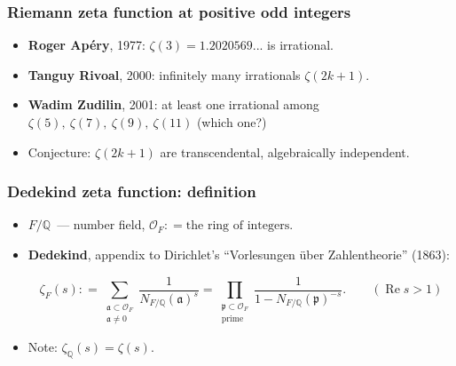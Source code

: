 \documentclass[handout]{beamer}
\newcommand{\personality}[1]{{\bf #1}}
\newcommand{\QQ}{\mathbb{Q}}
\renewcommand{\O}{\mathcal{O}}
\newcommand{\dfn}{\mathrel{\mathop:}=}
\begin{document}

\begin{frame}
  \frametitle{Riemann zeta function at positive odd integers}

  \begin{itemize}
  \item<2-> \personality{Roger Ap\'ery}, 1977: $\zeta (3) = 1.2020569...$ is
    irrational.

  \item<3-> \personality{Tanguy Rivoal}, 2000: infinitely many irrationals
    $\zeta (2k+1)$.

  \item<4-> \personality{Wadim Zudilin}, 2001: at least one irrational among\\
    $\zeta(5), ~ \zeta(7), ~ \zeta(9), ~ \zeta(11)$ (which one?)

  \item<5-> Conjecture: $\zeta (2k+1)$ are transcendental, algebraically
    independent.
  \end{itemize}
\end{frame}


\begin{frame}
  \frametitle{Dedekind zeta function: definition}

  \begin{itemize}
  \item<2-> $F/\QQ$~--- number field, $\O_F \dfn \text{the ring of integers}$.

  \item<3-> \personality{Dedekind}, appendix to Dirichlet's ``Vorlesungen \"uber
    Zahlentheorie'' (1863):

    \[ \zeta_F (s) \dfn \sum_{\substack{\mathfrak{a} \subset \O_F \\ \mathfrak{a} \ne 0}} \frac{1}{N_{F/\QQ} (\mathfrak{a})^s} =
      \prod_{\substack{\mathfrak{p} \subset \O_F \\ \text{prime}}} \frac{1}{1 - N_{F/\QQ} (\mathfrak{p})^{-s}}.
      \quad\quad (\operatorname{Re} s > 1) \]

  \item<4-> Note: $\zeta_\QQ (s) = \zeta (s)$.
  \end{itemize}
\end{frame}

\end{document}
